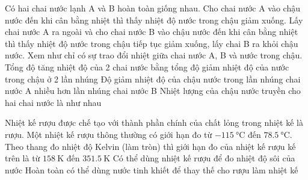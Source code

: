 \begin{ex}
	Có hai chai nước lạnh A và B hoàn toàn giống nhau. Cho chai nước A vào chậu nước đến khi cân bằng nhiệt thì thấy nhiệt độ nước trong chậu giảm xuống. Lấy chai nước A ra ngoài và cho chai nước B vào chậu nước đến khi cân bằng nhiệt thì thấy nhiệt độ nước trong chậu tiếp tục giảm xuống, lấy chai B ra khỏi chậu nước. Xem như chỉ có sự trao đổi nhiệt giữa chai nước A, B và nước trong chậu.
	{Tổng độ tăng nhiệt độ của 2 chai nước bằng tổng độ giảm nhiệt độ của nước trong chậu ở 2 lần nhúng}
	{\True Độ giảm nhiệt độ của chậu nước trong lần nhúng chai nước A nhiều hơn lần nhúng chai nước	B}
	{Nhiệt lượng của chậu nước truyền cho hai chai nước là như nhau}
\end{ex}
\begin{ex}
	Nhiệt kế rượu được chế tạo với thành phần chính của chất lỏng trong nhiệt kế là rượu. Một nhiệt kế rượu thông thường có giới hạn đo từ $\SI{-115}{\celsius}$ đến $\SI{78,5}{\celsius}$.
	{\True Theo thang đo nhiệt độ Kelvin (làm tròn) thì giới hạn đo của nhiệt kế rượu kế trên là từ $\SI{158}{\kelvin}$ đến $\SI{351.5}{\kelvin}$}
	{Có thể dùng nhiệt kế rượu để đo nhiệt độ sôi của nước}
	{Hoàn toàn có thể dùng nước tinh khiết để thay thế cho rượu làm nhiệt kế}
	\loigiai{}
\end{ex}

